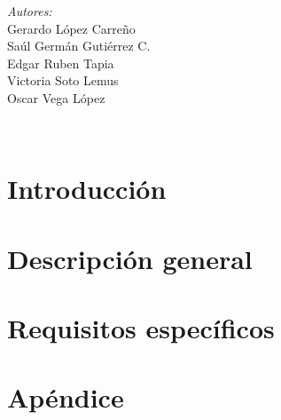 \documentclass[12pt]{article}
\makeatletter
\let\theauthor\@author
\makeatother
\begin{document}
\begin{titlepage}
\begin{minipage}{0.4\textwidth}
    \begin{flushright} \large
      \emph{Autores:} \\
      Gerardo López Carreño \\
      Saúl Germán Gutiérrez C. \\
      Edgar Ruben Tapia \\
      Victoria Soto Lemus \\
      Oscar Vega López\\
    \end{flushright}
    
  \end{minipage}\\[2 cm]
     
\end{titlepage}


\tableofcontents
\pagebreak

 
\section{Introducción}


\pagebreak

\section{Descripción general}


\pagebreak

\section{Requisitos específicos}


\pagebreak

\section{Apéndice}


\printbibliography
\end{document}

